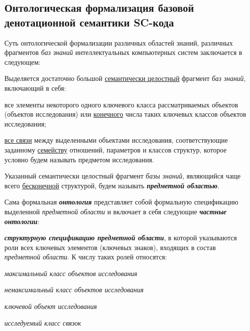 \subsection{Онтологическая формализация базовой денотационной семантики SC-кода}
\label{sec_ontological_formalization_basic_denotational_semantics_sc-code}

Суть онтологической формализации различных областей знаний, различных фрагментов \textit{баз знаний} интеллектуальных компьютерных систем заключается в следующем:
\begin{textitemize}
	\item Выделяется достаточно большой \underline{семантически целостный} фрагмент \textit{баз знаний}, включающий в себя:
	\begin{textitemize}
		\item все элементы некоторого одного ключевого класса рассматриваемых объектов (объектов исследования) или \underline{конечного} числа таких ключевых классов объектов исследования;
		\item \underline{все связи} между выделенными объектами исследования, соответствующие заданному \underline{семейству} отношений, параметров и классов структур, которое условно будем называть предметом исследования. 
	\end{textitemize}
	\item Указанный семантически целостный фрагмент \textit{базы знаний}, являющийся чаще всего \underline{бесконечной} структурой, будем называть \textbf{\textit{предметной областью}}.
	\item Сама формальная \textbf{\textit{онтология}} представляет собой формальную спецификацию выделенной \textit{предметной области} и включает в себя следующие \textbf{\textit{частные онтологии}}:
	\begin{textitemize}
		\item \textbf{\textit{структурную спецификацию предметной области}}, в которой указываются роли всех ключевых элементов (ключевых знаков), входящих в состав \textit{предметной области}. К числу таких ролей относятся:
		\begin{textitemize}
			\item \textit{максимальный класс объектов исследования\scnrolesign}
			\item \textit{немаксимальный класс объектов исследования\scnrolesign}
			\item \textit{ключевой объект исследования\scnrolesign}
			\item \textit{исследуемый класс связок\scnrolesign}

\end{textitemize}
\end{textitemize}
\end{textitemize}
